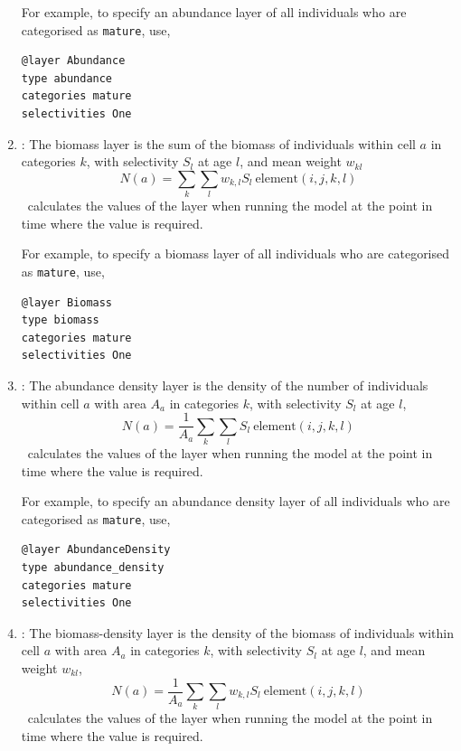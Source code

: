 \begin{enumerate}
For example, to specify an abundance layer of all individuals who are categorised as \texttt{mature}, use,
{\small{\begin{verbatim}
@layer Abundance
type abundance
categories mature
selectivities One
\end{verbatim}}}

\item {}: The biomass layer is the sum of the biomass of individuals within cell $a$ in categories $k$, with selectivity $S_l$ at age $l$, and mean weight $w_{kl}$
\begin{equation}
  N(a) = \sum\limits_{k} \sum\limits_l w_{k,l} S_l \ \text{element}(i,j,k,l) 
\end{equation}
\SPM\ calculates the values of the layer when running the model at the point in time where the value is required.

For example, to specify a biomass layer of all individuals who are categorised as \texttt{mature}, use,
{\small{\begin{verbatim}
@layer Biomass
type biomass
categories mature
selectivities One
\end{verbatim}}}

\item {}: The abundance density layer is the density of the number of individuals within cell $a$ with area $A_a$ in categories $k$, with selectivity $S_l$ at age $l$,
\begin{equation}
  N(a) = \frac{1}{A_a} \sum\limits_{k} \sum\limits_l S_l \ \text{element}(i,j,k,l)
\end{equation}
\SPM\ calculates the values of the layer when running the model at the point in time where the value is required.

For example, to specify an abundance density layer of all individuals who are categorised as \texttt{mature}, use,
{\small{\begin{verbatim}
@layer AbundanceDensity
type abundance_density
categories mature
selectivities One
\end{verbatim}}}

\item {}: The biomass-density layer is the density of the biomass of individuals within cell $a$ with area $A_a$ in categories $k$, with selectivity $S_l$ at age $l$, and mean weight $w_{kl}$,
\begin{equation}
  N(a) = \frac{1}{A_a} \sum\limits_{k} \sum\limits_l w_{k,l} S_l \ \text{element}(i,j,k,l)
\end{equation}
\SPM\ calculates the values of the layer when running the model at the point in time where the value is required.


\end{enumerate}
